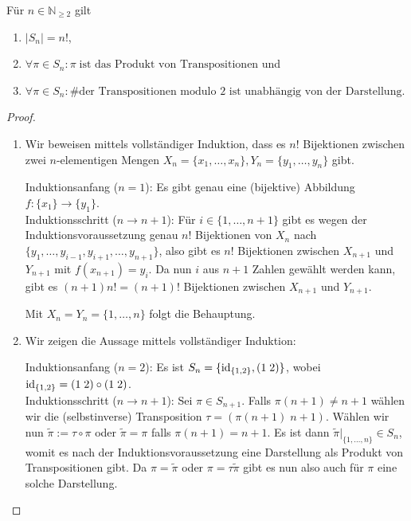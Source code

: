 \begin{proposition}\label{prop:sym_gruppe} Für $n \in \mathbb{N}_{\ge 2}$ gilt
    \begin{enumerate}
        \item $\vert S_n \vert = n!$,
        \item $\forall \pi \in S_n: \pi\;\text{ist das Produkt von Transpositionen}$ und
        \item $\forall \pi \in S_n: \text{\# der Transpositionen modulo 2 ist unabhängig von der Darstellung}$.
    \end{enumerate}
\end{proposition}
\begin{proof}{\ }
    \begin{enumerate}
        \item Wir beweisen mittels vollständiger Induktion, dass es $n!$ Bijektionen zwischen zwei $n$-elementigen Mengen $X_n = \{x_1, \ldots, x_n\}, Y_n = \{y_1, \ldots, y_n\}$ gibt.
        
        Induktionsanfang ($n = 1$): Es gibt genau eine (bijektive) Abbildung $f: \{x_1\} \to \{y_1\}$.\\
        Induktionsschritt ($n \to n+1$): Für $i \in \{1, \ldots, n+1\}$ gibt es wegen der Induktionsvoraussetzung genau $n!$ Bijektionen von $X_n$ nach $\{y_1, \ldots, y_{i-1}, y_{i+1}, \ldots, y_{n+1}\}$, also gibt es $n!$ Bijektionen zwischen $X_{n+1}$ und $Y_{n+1}$ mit $f(x_{n+1}) = y_i$. Da nun $i$ aus $n+1$ Zahlen gewählt werden kann, gibt es $(n+1)n! = (n+1)!$ Bijektionen zwischen $X_{n+1}$ und $Y_{n+1}$.

        Mit $X_n = Y_n = \{1, \ldots, n\}$ folgt die Behauptung.

        \item Wir zeigen die Aussage mittels vollständiger Induktion:
        
        Induktionsanfang ($n = 2$): Es ist $S_n = \{ \operatorname{id}_{\{1,2\}}, (1\; 2) \}$, wobei $\operatorname{id}_{\{1,2\}} = (1\; 2) \circ (1\; 2)$.\\
        Induktionsschritt ($n \to n+1$): Sei $\pi \in S_{n+1}$. Falls $\pi(n+1) \not= n+1$ wählen wir die (selbstinverse) Transposition $\tau = (\pi(n+1)\; n+1)$. Wählen wir nun $\tilde{\pi} := \tau \circ \pi$ oder $\tilde{\pi} = \pi$ falls $\pi(n+1) = n+1$. Es ist dann $\tilde{\pi}\vert_{\{1,\ldots,n\}} \in S_n$, womit es nach der Induktionsvoraussetzung eine Darstellung als Produkt von Transpositionen gibt. Da $\pi = \tilde\pi$ oder $\pi = \tau\tilde\pi$ gibt es nun also auch für $\pi$ eine solche Darstellung.


\end{enumerate}
\end{proof}
